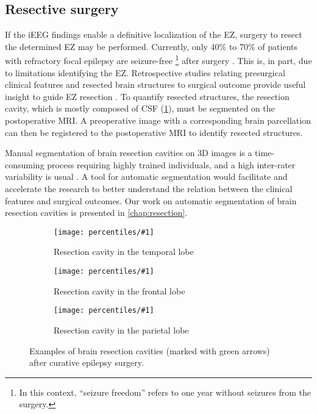 \subsection{Resective surgery}

If the \ac{iEEG} findings enable a definitive localization of the \ac{EZ}, surgery to resect the determined \ac{EZ} may be performed.
Currently, only 40\% to 70\% of patients with refractory focal epilepsy are seizure-free%
\footnote{In this context, ``seizure freedom'' refers to one year without seizures from the surgery.}
after surgery \cite{jobst_resective_2015}.
This is, in part, due to limitations identifying the \ac{EZ}.
Retrospective studies relating presurgical clinical features and resected brain structures to surgical outcome provide useful insight to guide \ac{EZ} resection \cite{jobst_resective_2015}.
To quantify resected structures, the resection cavity, which is mostly composed of \ac{CSF} (\cref{fig:cavities}), must be segmented on the postoperative \ac{MRI}.
A preoperative image with a corresponding brain parcellation can then be registered to the postoperative \ac{MRI} to identify resected structures.

Manual segmentation of brain resection cavities on 3D images is a time-consuming process requiring highly trained individuals, and a high inter-rater variability is usual \cite{havaei_brain_2017}.
A tool for automatic segmentation would facilitate and accelerate the research to better understand the relation between the clinical features and surgical outcomes.
Our work on automatic segmentation of brain resection cavities is presented in \cref{chap:resection}.


\newcommand{\plotcavities}[2]{
  \begin{subfigure}{0.8\linewidth}
    \texttt{[image: percentiles/\#1]}
    \caption{#2}
  \end{subfigure}
}

\begin{figure}
  \centering

  \plotcavities{p_050_0185_arrows}{Resection cavity in the temporal lobe}
  \plotcavities{p_075_1263_arrows}{Resection cavity in the frontal lobe}
  \plotcavities{p_025_0039_arrows}{Resection cavity in the parietal lobe}

  \caption[Examples of brain resection cavities after curative epilepsy surgery.]{
    Examples of brain resection cavities (marked with green arrows) after curative epilepsy surgery.
  }
  \label{fig:cavities}
\end{figure}
